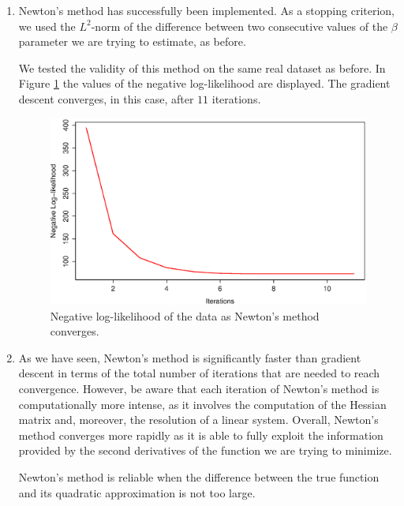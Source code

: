 \documentclass{homework}
\begin{document}
\begin{enumerate}[label=(\Alph*)]
\item Newton's method has successfully been implemented. As a stopping criterion, we used the $L^2$-norm of the difference between two consecutive values of the $\beta$ parameter we are trying to estimate, as before.

We tested the validity of this method on the same real dataset as before. In Figure \ref{fig:newton} the values of the negative log-likelihood are displayed. The gradient descent converges, in this case, after $11$ iterations.

\begin{figure}[!ht]
\centering
\includegraphics[width=0.6\columnwidth]{./Img/ll_2}
\caption{Negative log-likelihood of the data as Newton's method converges.}
\label{fig:newton}
\end{figure}

\item As we have seen, Newton's method is significantly faster than gradient descent in terms of the total number of iterations that are needed to reach convergence. However, be aware that each iteration of Newton's method is computationally more intense, as it involves the computation of the Hessian matrix and, moreover, the resolution of a linear system. Overall, Newton's method converges more rapidly as it is able to fully exploit the information provided by the second derivatives of the function we are trying to minimize. 

Newton's method is reliable when the difference between the true function and its quadratic approximation is not too large. 


\end{enumerate}
\end{document}
